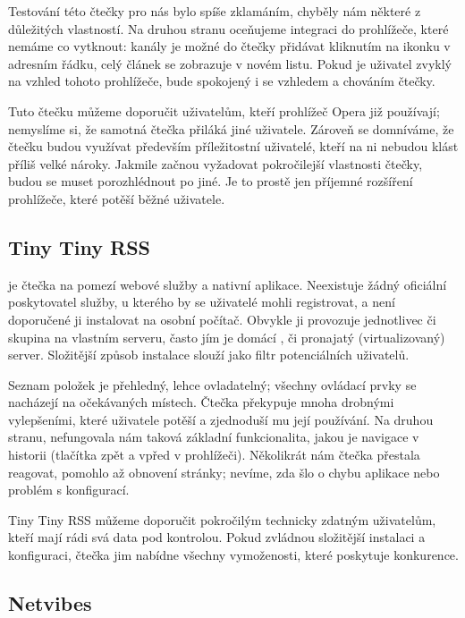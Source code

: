 Testování této čtečky pro nás bylo spíše zklamáním, chyběly nám některé z důležitých vlastností.
Na druhou stranu oceňujeme integraci do prohlížeče, které nemáme co vytknout: kanály je možné do čtečky přidávat kliknutím na ikonku v adresním řádku, celý článek se zobrazuje v novém listu.
Pokud je uživatel zvyklý na vzhled tohoto prohlížeče, bude spokojený i se vzhledem a chováním čtečky.

Tuto čtečku můžeme doporučit uživatelům, kteří prohlížeč Opera již používají; nemyslíme si, že samotná čtečka přiláká jiné uživatele.
Zároveň se domníváme, že čtečku budou využívat především příležitostní uživatelé, kteří na ni nebudou klást příliš velké nároky.
Jakmile začnou vyžadovat pokročilejší vlastnosti čtečky, budou se muset porozhlédnout po jiné.
Je to prostě jen příjemné rozšíření prohlížeče, které potěší běžné uživatele.

\subsection{Tiny Tiny RSS}

 je čtečka na pomezí webové služby a nativní aplikace.
Neexistuje žádný oficiální poskytovatel služby, u kterého by se uživatelé mohli registrovat, a není doporučené ji instalovat na osobní počítač.
Obvykle ji provozuje jednotlivec či skupina na vlastním serveru, často jím je domácí , či pronajatý (virtualizovaný) server.
Složitější způsob instalace slouží jako filtr potenciálních uživatelů.

Seznam položek je přehledný, lehce ovladatelný; všechny ovládací prvky se nacházejí na očekávaných místech.
Čtečka překypuje mnoha drobnými vylepšeními, které uživatele potěší a zjednoduší mu její používání.
Na druhou stranu, nefungovala nám taková základní funkcionalita, jakou je navigace v historii (tlačítka zpět a vpřed v prohlížeči).
Několikrát nám čtečka přestala reagovat, pomohlo až obnovení stránky; nevíme, zda šlo o chybu aplikace nebo problém s konfigurací.

Tiny Tiny RSS můžeme doporučit pokročilým technicky zdatným uživatelům, kteří mají rádi svá data pod kontrolou.
Pokud zvládnou složitější instalaci a konfiguraci, čtečka jim nabídne všechny vymoženosti, které poskytuje konkurence.

\subsection{Netvibes}

